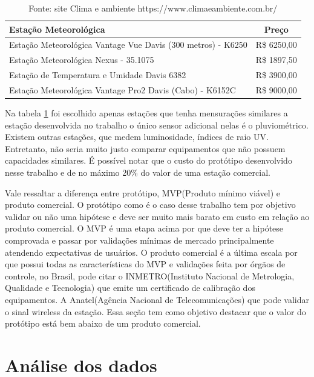 \begin{table}[!h]
\centering
\begin{tabular}{|l|c|}
\hline
\textbf{Estação Meteorológica}                               & \textbf{Preço} \\ \hline
Estação Meteorológica Vantage Vue Davis (300 metros) - K6250 & R\$ 6250,00    \\ \hline
Estação Meteorológica Nexus - 35.1075                        & R\$ 1897,50    \\ \hline
Estação de Temperatura e Umidade Davis 6382         & R\$ 3900,00   \\ \hline
Estação Meteorológica Vantage Pro2 Davis (Cabo) - K6152C     & R\$ 9000,00    \\ \hline
\end{tabular}
\caption{Fonte: site Clima e ambiente https://www.climaeambiente.com.br/}
\label{tab:custos_estacoes}
\end{table}

Na tabela \ref{tab:custos_estacoes} foi escolhido apenas estações que tenha mensurações similares a estação desenvolvida no trabalho o único sensor adicional nelas é o pluviométrico. Existem outras estações, que medem luminosidade, índices de raio UV. Entretanto, não seria muito justo comparar equipamentos que não possuem capacidades similares. É possível notar que o custo do protótipo desenvolvido nesse trabalho e de no máximo 20\% do valor de uma estação comercial.

Vale ressaltar a diferença entre protótipo, MVP(Produto mínimo viável) e produto comercial. O protótipo como é o caso desse trabalho tem por objetivo validar ou não uma hipótese e deve ser muito mais barato em custo em relação ao produto comercial. O MVP é uma etapa acima por que deve ter a hipótese comprovada e passar por validações mínimas de mercado principalmente atendendo expectativas de usuários. O produto comercial é a última escala por que possui todas as características do MVP e validações feita por órgãos de controle, no Brasil, pode citar o INMETRO(Instituto Nacional de Metrologia, Qualidade e Tecnologia) que emite um certificado de calibração dos equipamentos. A Anatel(Agência Nacional de Telecomunicações) que pode validar o sinal wireless da estação. Essa seção tem como objetivo destacar que o valor do protótipo está bem abaixo de um produto comercial.
 

\section{Análise dos dados}


